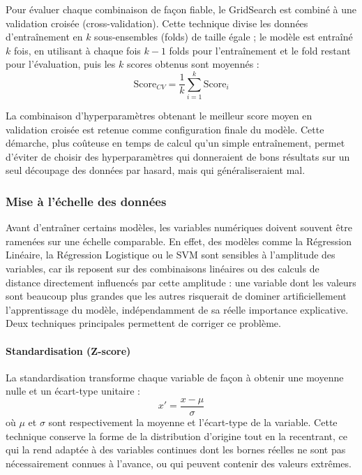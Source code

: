 \documentclass[a4paper,12pt, oneside]{article}
\begin{document}
Pour évaluer chaque combinaison de façon fiable, le GridSearch est combiné à une validation croisée (cross-validation). Cette technique divise les données d'entraînement en $k$ sous-ensembles (folds) de taille égale ; le modèle est entraîné $k$ fois, en utilisant à chaque fois $k-1$ folds pour l'entraînement et le fold restant pour l'évaluation, puis les $k$ scores obtenus sont moyennés :
\[
\text{Score}_{CV} = \frac{1}{k}\sum_{i=1}^{k} \text{Score}_i
\]

La combinaison d'hyperparamètres obtenant le meilleur score moyen en validation croisée est retenue comme configuration finale du modèle. Cette démarche, plus coûteuse en temps de calcul qu'un simple entraînement, permet d'éviter de choisir des hyperparamètres qui donneraient de bons résultats sur un seul découpage des données par hasard, mais qui généraliseraient mal.

\subsubsection{Mise à l'échelle des données}

Avant d'entraîner certains modèles, les variables numériques doivent souvent être ramenées sur une échelle comparable. En effet, des modèles comme la Régression Linéaire, la Régression Logistique ou le SVM sont sensibles à l'amplitude des variables, car ils reposent sur des combinaisons linéaires ou des calculs de distance directement influencés par cette amplitude : une variable dont les valeurs sont beaucoup plus grandes que les autres risquerait de dominer artificiellement l'apprentissage du modèle, indépendamment de sa réelle importance explicative. Deux techniques principales permettent de corriger ce problème.

\paragraph{Standardisation (Z-score)\\}
La standardisation transforme chaque variable de façon à obtenir une moyenne nulle et un écart-type unitaire :
\[
x' = \frac{x - \mu}{\sigma}
\]
où $\mu$ et $\sigma$ sont respectivement la moyenne et l'écart-type de la variable. Cette technique conserve la forme de la distribution d'origine tout en la recentrant, ce qui la rend adaptée à des variables continues dont les bornes réelles ne sont pas nécessairement connues à l'avance, ou qui peuvent contenir des valeurs extrêmes.
\end{document}
